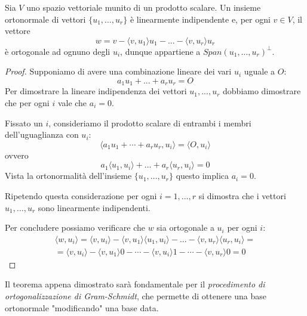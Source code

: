 \begin{theorem}\label{orto}
	Sia $V$ uno spazio vettoriale munito di un prodotto scalare. Un insieme
	ortonormale di vettori $\{u_1, \dots, u_r\}$ è linearmente indipendente
	e, per ogni $v \in V$, il vettore
	\[
		w = v - \langle v, u_1 \rangle u_1 - ... -\langle v, u_r \rangle u_r
	\]
	è ortogonale ad ognuno degli $u_i$, dunque appartiene a
	$Span(u_1, \dots, u_r)^{\perp}$.
	\begin{proof}
		Supponiamo di avere una combinazione lineare dei vari $u_i$ uguale a $O$:
		\[
			a_1 u_1 + ... + a_r u_r = O
		\]
		Per dimostrare la lineare indipendenza dei vettori $u_1, ..., u_r$ dobbiamo
		dimostrare che per ogni $i$ vale che $a_i = 0$.

		Fissato un $i$, consideriamo il prodotto scalare di entrambi i membri
		dell'uguaglianza con $u_i$:
		\[
			\langle a_1 u_1 + \cdots + a_r u_r, u_i \rangle = \langle O, u_i \rangle
		\]
		ovvero
		\[
			a_1 \langle u_1, u_i \rangle + \dots + a_r \langle u_r, u_i \rangle = 0
		\]
		Vista la ortonormalità dell'insieme $\{ u_1, \dots, u_r \}$ questo implica
		$a_i = 0$.

		Ripetendo questa considerazione per ogni $i = 1, \dots, r$ si dimostra che i vettori
		$u_1, \dots, u_r$ sono linearmente indipendenti.

		Per concludere possiamo verificare che $w$ sia ortogonale a $u_i$ per ogni $i$:
		\begin{gather*}
			\langle w, u_i \rangle = \langle v, u_i \rangle - \langle v, u_1 \rangle
			\langle u_1, u_i \rangle - ... - \langle v, u_r \rangle \langle u_r, u_i \rangle =\\
			= \langle v, u_i \rangle - \langle v, u_1 \rangle 0 - \cdots - \langle v, u_i \rangle 1
			- \cdots - \langle v, u_r \rangle 0 = 0
		\end{gather*}
	\end{proof}
\end{theorem}

Il teorema appena dimostrato sarà fondamentale per il
\emph{procedimento di ortogonalizzazione di Gram-Schmidt}, che permette di ottenere una base
ortonormale "modificando" una base data.

